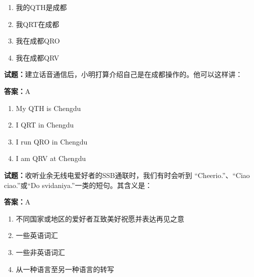 \documentclass{ctexbook}
\begin{document}
\begin{enumerate}[leftmargin=3em]
  \item 我的QTH是成都 

  \item 我QRT在成都 

  \item 我在成都QRO 

  \item 我在成都QRV 

\end{enumerate}





\vspace{1em}

\textbf{试题：}建立话音通信后，小明打算介绍自己是在成都操作的。他可以这样讲： 

\textbf{答案：}A 

\begin{enumerate}[leftmargin=3em]
  \item My QTH is Chengdu 

  \item I QRT in Chengdu 

  \item I run QRO in Chengdu 

  \item I am QRV at Chengdu 

\end{enumerate}





\vspace{1em}

\textbf{试题：}收听业余无线电爱好者的SSB通联时，我们有时会听到 “Cheerio.”、“Ciao ciao.”或“Do 
svidaniya.”一类的短句。其含义是： 

\textbf{答案：}A 

\begin{enumerate}[leftmargin=3em]
  \item 不同国家或地区的爱好者互致美好祝愿并表达再见之意 

  \item 一些英语词汇 

  \item 一些非英语词汇 

  \item 从一种语言至另一种语言的转写 

\end{enumerate}
\end{document}
